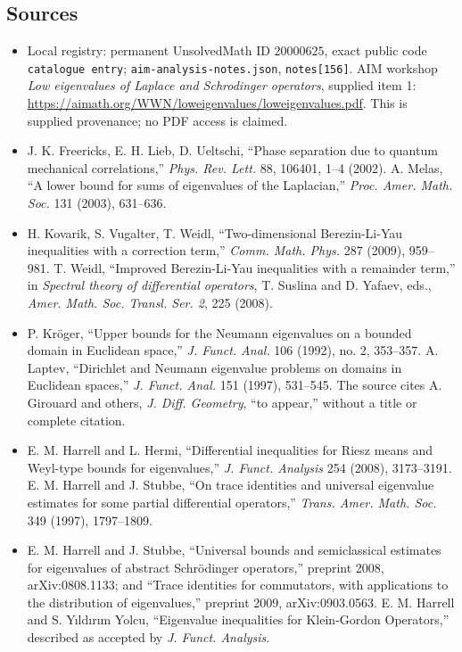 \documentclass[11pt]{article}
\begin{document}
\subsection{Sources}
\begin{itemize}
\item Local registry: permanent UnsolvedMath ID \(20000625\), exact public code \texttt{catalogue entry}; \texttt{aim-analysis-notes.json}, \texttt{notes[156]}. AIM workshop \emph{Low eigenvalues of Laplace and Schrodinger operators}, supplied item 1: \url{https://aimath.org/WWN/loweigenvalues/loweigenvalues.pdf}. This is supplied provenance; no PDF access is claimed.
\item J. K. Freericks, E. H. Lieb, D. Ueltschi, ``Phase separation due to quantum mechanical correlations,'' \emph{Phys. Rev. Lett.} 88, 106401, 1--4 (2002). A. Melas, ``A lower bound for sums of eigenvalues of the Laplacian,'' \emph{Proc. Amer. Math. Soc.} 131 (2003), 631--636.
\item H. Kovarik, S. Vugalter, T. Weidl, ``Two-dimensional Berezin-Li-Yau inequalities with a correction term,'' \emph{Comm. Math. Phys.} 287 (2009), 959--981. T. Weidl, ``Improved Berezin-Li-Yau inequalities with a remainder term,'' in \emph{Spectral theory of differential operators}, T. Suslina and D. Yafaev, eds., \emph{Amer. Math. Soc. Transl. Ser. 2}, 225 (2008).
\item P. Kr\"oger, ``Upper bounds for the Neumann eigenvalues on a bounded domain in Euclidean space,'' \emph{J. Funct. Anal.} 106 (1992), no. 2, 353--357. A. Laptev, ``Dirichlet and Neumann eigenvalue problems on domains in Euclidean spaces,'' \emph{J. Funct. Anal.} 151 (1997), 531--545. The source cites A. Girouard and others, \emph{J. Diff. Geometry}, ``to appear,'' without a title or complete citation.
\item E. M. Harrell and L. Hermi, ``Differential inequalities for Riesz means and Weyl-type bounds for eigenvalues,'' \emph{J. Funct. Analysis} 254 (2008), 3173--3191. E. M. Harrell and J. Stubbe, ``On trace identities and universal eigenvalue estimates for some partial differential operators,'' \emph{Trans. Amer. Math. Soc.} 349 (1997), 1797--1809.
\item E. M. Harrell and J. Stubbe, ``Universal bounds and semiclassical estimates for eigenvalues of abstract Schr\"odinger operators,'' preprint 2008, arXiv:0808.1133; and ``Trace identities for commutators, with applications to the distribution of eigenvalues,'' preprint 2009, arXiv:0903.0563. E. M. Harrell and S. Y\i ld\i r\i m Yolcu, ``Eigenvalue inequalities for Klein-Gordon Operators,'' described as accepted by \emph{J. Funct. Analysis}.

\end{itemize}
\end{document}
